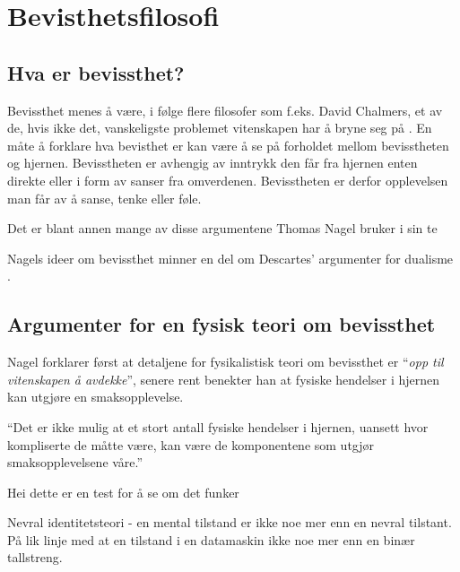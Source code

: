 \section{Bevisthetsfilosofi}

\subsection{Hva er bevissthet?}

Bevissthet menes å være, i følge flere filosofer som f.eks. David Chalmers, et av de, hvis ikke det, 
vanskeligste problemet vitenskapen har å bryne seg på \autocite{Chalmers1995}. 
En måte å forklare hva bevisthet er kan være å se på forholdet mellom bevisstheten og hjernen.
Bevisstheten er avhengig av inntrykk den får fra hjernen enten direkte eller i form av sanser fra omverdenen. 
Bevisstheten er derfor opplevelsen man får av å sanse, tenke eller føle. 

Det er blant annen mange av disse argumentene Thomas Nagel bruker i sin te



Nagels ideer om bevissthet minner en del om Descartes' argumenter for dualisme \autocite[156]{Dybvig2003}.


\subsection{Argumenter for en fysisk teori om bevissthet}


Nagel forklarer først at detaljene for fysikalistisk teori om bevissthet er ``\emph{opp til vitenskapen å avdekke}'',
senere rent benekter han at fysiske hendelser i hjernen kan utgjøre en smaksopplevelse.
\begin{pquotation}{\cite[36]{Nagel2003}}
    ``Det er ikke mulig at et stort antall fysiske hendelser i hjernen,
uansett hvor kompliserte de måtte være, 
kan være de komponentene som utgjør smaksopplevelsene våre.''
\end{pquotation}

Hei dette er en test \autocite{snl:Böhmen} for å se om det funker

Nevral identitetsteori - en mental tilstand er ikke noe mer enn en nevral tilstant.
På lik linje med at en tilstand i en datamaskin ikke noe mer enn en binær tallstreng.